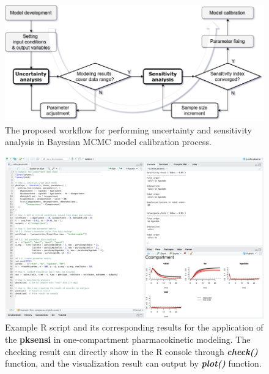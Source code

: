 \documentclass[preprint,12pt, a4paper]{elsarticle}
\begin{document}


 


\newpage

\clearpage
\newpage

\begin{landscape}

\begin{figure}
\includegraphics[width=1\linewidth]{workflow} 
\caption{The proposed workflow for performing uncertainty and sensitivity analysis in Bayesian MCMC model calibration process.}
\label{fig:workflow}
\end{figure}

\clearpage
\newpage

\begin{figure}
\includegraphics[width=1\linewidth]{example-1} 
\caption{Example R script and its corresponding results for the application of the \textbf{pksensi} in one-compartment pharmacokinetic modeling. The checking result can directly show in the R console through \textit{\textbf{check()}} function, and the visualization result can output by \textit{\textbf{plot()}} function.}
\label{fig:example-1}
\end{figure}


\end{landscape}
\end{document}
